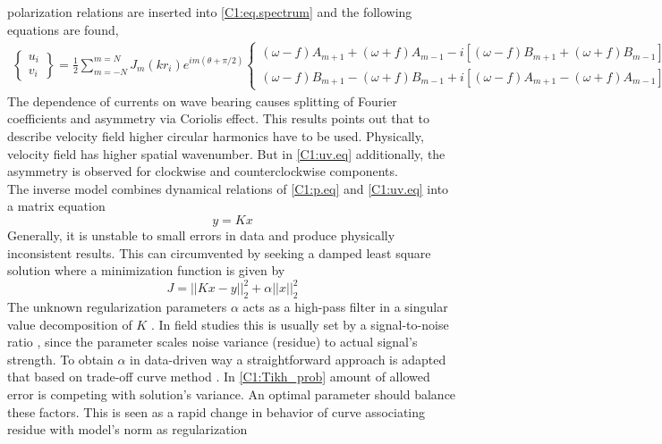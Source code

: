 \documentclass[12pt]{article}
\begin{document}
polarization relations \citep[e.g.,][]{muller2000scattering} are inserted into 
\eqref{C1:eq.spectrum} and the following equations are found,
\begin{align}
\label{C1:uv.eq}
\begin{Bmatrix}
u_i \\ v_i
\end{Bmatrix}
= \frac{1}{2} \sum_{m = -N}^{m = N} J_{m} (kr_i) e^{im(\theta + \pi/2)}
\begin{Bmatrix}
(\omega - f) A_{m + 1} + (\omega + f) A_{m - 1} - i [(\omega - f) B_{m + 1} + (\omega + f) B_{m - 
1}] \\ 
(\omega - f) B_{m + 1} - (\omega + f) B_{m - 1} + i [ (\omega - f) A_{m + 1} - (\omega + f) A_{m - 
1}]
\end{Bmatrix}
\end{align}
The dependence of currents on wave bearing causes splitting of Fourier coefficients and 
asymmetry via Coriolis effect. This results points out that to describe velocity field 
higher circular harmonics have to be used. Physically, velocity field has higher spatial 
wavenumber. But in \eqref{C1:uv.eq} additionally, the asymmetry is observed 
for clockwise and counterclockwise components.\\
The inverse model combines dynamical relations of \eqref{C1:p.eq} and \eqref{C1:uv.eq} into a 
matrix equation
\begin{equation}
y = K x
\end{equation}
Generally, it is unstable to small errors in data and produce physically inconsistent results. This 
can circumvented by seeking a damped least square solution \citep{munk2009ocean} where a 
minimization function is given by
\begin{equation}
\label{C1:Tikh_prob}
J = ||K x - y||^2_2 + \alpha ||x||^2_2
\end{equation}
The unknown regularization parameters $\alpha$ acts as a high-pass filter in a singular value 
decomposition of $K$ \citep{bennett1992inverse}. In field studies this is usually set by a 
signal-to-noise ratio \citep{munk2009ocean}, since the parameter scales noise variance (residue) 
to actual signal's strength. To obtain $\alpha$ in data-driven way a straightforward approach is 
adapted that based on 
trade-off curve method \citep{hansen1993use}. In \eqref{C1:Tikh_prob} amount of allowed error 
is competing with solution's variance. An optimal parameter should balance these factors. This is 
seen as a rapid change in behavior of curve associating residue with model's norm as regularization 
\end{document}
